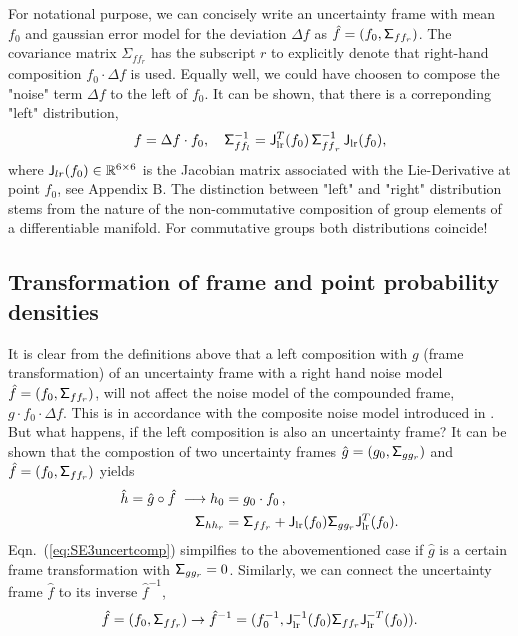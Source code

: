 \documentclass[conference]{IEEEtran}
\newcommand{\real}{\Bbb R}
\newcommand{\sigmaff}{\mathsf{\Sigma^{-1}_\mathnormal{{ff}_r}}}
\newcommand{\sfSigma}[1]{\mathsf{\Sigma_\mathnormal{#1}}}
\newcommand{\beq}{\begin{equation}}
\newcommand{\eeq}{\end{equation}}
\begin{document}
For notational purpose, we can concisely write an uncertainty frame with mean
$f_0$ and gaussian error model for the deviation $\Delta f$ as $\hat{f}=(f_0, \sfSigma{ff_r})$.
The covariance matrix ${\mathsf \Sigma}_{ff_r}$ has the subscript $r$ to explicitly denote
that right-hand composition $f_0\cdot\Delta f$ is used. Equally well, we could have choosen to compose the
"noise" term $\Delta f$ to the left of $f_0$. It can be shown, that there is a correponding "left" distribution,
\beq
    f=\Delta f \cdot f_0, \quad {\mathsf \Sigma}^{-1}_{ff_l} =
    {\sf J}_{\rm lr}^T(f_0)\, \sigmaff \,{\sf J}_{\rm lr}(f_0),
    \label{eq:SE3leftdist}
\eeq
where ${\sf J}_{lr}(f_0) \in \real^{6\times6}$ is the Jacobian matrix associated with the Lie-Derivative
at point $f_0$, see Appendix B. The distinction between "left" and "right" distribution stems from the nature
of the non-commutative composition of group elements of a differentiable manifold. For commutative groups
both distributions coincide!

\subsection{Transformation of frame and point probability densities}

It is clear from the definitions above that a left composition with $g$ (frame transformation) of
an uncertainty frame with a right hand noise model $\hat{f}=(f_0, \sfSigma{ff_r})$, will not affect the noise model
of the compounded frame, $g\cdot f_0\cdot \Delta f$. This is in accordance with the composite noise model
introduced in \cite{Pennec}. But what happens, if the left composition is also an uncertainty frame? It can be shown that the compostion of two uncertainty frames $\hat{g}=(g_0,\sfSigma{gg_r})$ and $\hat{f}=(f_0,\sfSigma{ff_r})$ yields
\beq
\begin{split}
    \hat{h}=\hat{g}\circ \hat{f}\; \longrightarrow h_0 &=g_0 \cdot f_0\, ,\\
    \sfSigma{hh_r} &= \sfSigma{ff_r} + {\sf J}_{\rm lr}(f_0) \sfSigma{gg_r}
    {\sf J}_{\rm lr}^T(f_0). \label{eq:SE3uncertcomp}
\end{split}
\eeq
Eqn.~(\ref{eq:SE3uncertcomp}) simpilfies  to the abovementioned case if $\hat{g}$ is a certain frame transformation
with $\sfSigma{gg_r} = 0$. Similarly, we can connect the uncertainty frame $\hat{f}$ to its inverse $\hat{f}^{-1}$,
\beq
    \hat{f}=(f_0,\sfSigma{ff_r}) \rightarrow \hat{f}^{-1}=(f_0^{-1},{\sf J}_{\rm lr}^{-1}(f_0)
    \sfSigma{ff_r}{\sf J}_{\rm lr}^{-T}(f_0)).
\eeq
\end{document}
